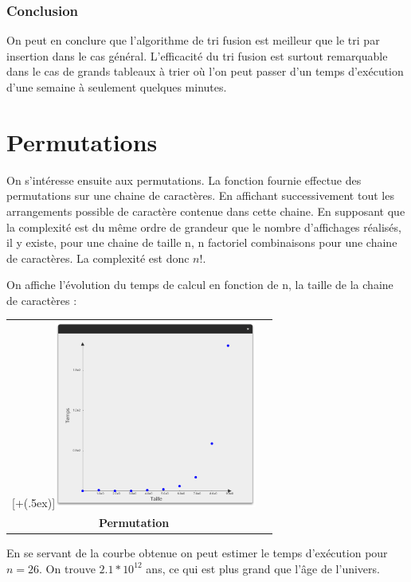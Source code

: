 \documentclass[12pt]{article}
\newcommand*{\addheight}[2][.5ex]{%
  \raisebox{0pt}[\dimexpr\height+(#1)\relax]{#2}%
}
\begin{document}
\subsubsection*{Conclusion}

On peut en conclure que l'algorithme de tri fusion est meilleur que le tri par insertion dans le cas général. L'efficacité du tri fusion est surtout remarquable dans le cas de grands tableaux à trier où l'on peut passer d'un temps d'exécution d'une semaine à seulement quelques minutes.


\section{Permutations}

On s'intéresse ensuite aux permutations.
La fonction fournie effectue des permutations sur une chaine de caractères. En affichant successivement tout les arrangements possible de caractère contenue dans cette chaine.
En supposant que la complexité est du même ordre de grandeur que le nombre d'affichages réalisés, il y existe, pour une chaine de taille n, n factoriel combinaisons pour une chaine de caractères. La complexité est donc $n!$.


On affiche l'évolution du temps de calcul en fonction de n, la taille de la chaine de caractères :

\begin{tabular}[H]{c c}
    \addheight{\includegraphics[width=18em]{permu.png}}  & \\
    \small \textbf{Permutation} & \\
\end{tabular}

En se servant de la courbe obtenue on peut estimer le temps d'exécution pour $n=26$. On trouve $2.1*10^12$ ans, ce qui est plus grand que l'âge de l'univers.
\end{document}
